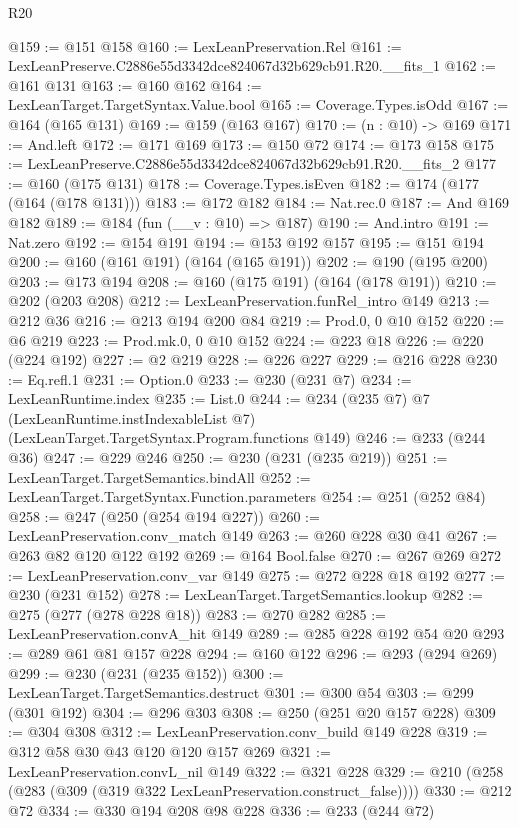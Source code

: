 \begin{lexlean}{R20}
\begin{coremodule}
@159 := @151 @158
@160 := LexLeanPreservation.Rel
@161 := LexLeanPreserve.C2886e55d3342dce824067d32b629cb91.R20.__fits_1
@162 := @161 @131
@163 := @160 @162
@164 := LexLeanTarget.TargetSyntax.Value.bool
@165 := Coverage.Types.isOdd
@167 := @164 (@165 @131)
@169 := @159 (@163 @167)
@170 := (n : @10) -> @169
@171 := And.left
@172 := @171 @169
@173 := @150 @72
@174 := @173 @158
@175 := LexLeanPreserve.C2886e55d3342dce824067d32b629cb91.R20.__fits_2
@177 := @160 (@175 @131)
@178 := Coverage.Types.isEven
@182 := @174 (@177 (@164 (@178 @131)))
@183 := @172 @182
@184 := Nat.rec.{0}
@187 := And @169 @182
@189 := @184 (fun (__v : @10) => @187)
@190 := And.intro
@191 := Nat.zero
@192 := @154 @191
@194 := @153 @192 @157
@195 := @151 @194
@200 := @160 (@161 @191) (@164 (@165 @191))
@202 := @190 (@195 @200)
@203 := @173 @194
@208 := @160 (@175 @191) (@164 (@178 @191))
@210 := @202 (@203 @208)
@212 := LexLeanPreservation.funRel_intro @149
@213 := @212 @36
@216 := @213 @194 @200 @84
@219 := Prod.{0, 0} @10 @152
@220 := @6 @219
@223 := Prod.mk.{0, 0} @10 @152
@224 := @223 @18
@226 := @220 (@224 @192)
@227 := @2 @219
@228 := @226 @227
@229 := @216 @228
@230 := Eq.refl.{1}
@231 := Option.{0}
@233 := @230 (@231 @7)
@234 := LexLeanRuntime.index
@235 := List.{0}
@244 := @234
    (@235 @7)
    @7
    (LexLeanRuntime.instIndexableList @7)
    (LexLeanTarget.TargetSyntax.Program.functions @149)
@246 := @233 (@244 @36)
@247 := @229 @246
@250 := @230 (@231 (@235 @219))
@251 := LexLeanTarget.TargetSemantics.bindAll
@252 := LexLeanTarget.TargetSyntax.Function.parameters
@254 := @251 (@252 @84)
@258 := @247 (@250 (@254 @194 @227))
@260 := LexLeanPreservation.conv_match @149
@263 := @260 @228 @30 @41
@267 := @263 @82 @120 @122 @192
@269 := @164 Bool.false
@270 := @267 @269
@272 := LexLeanPreservation.conv_var @149
@275 := @272 @228 @18 @192
@277 := @230 (@231 @152)
@278 := LexLeanTarget.TargetSemantics.lookup
@282 := @275 (@277 (@278 @228 @18))
@283 := @270 @282
@285 := LexLeanPreservation.convA_hit @149
@289 := @285 @228 @192 @54 @20
@293 := @289 @61 @81 @157 @228
@294 := @160 @122
@296 := @293 (@294 @269)
@299 := @230 (@231 (@235 @152))
@300 := LexLeanTarget.TargetSemantics.destruct
@301 := @300 @54
@303 := @299 (@301 @192)
@304 := @296 @303
@308 := @250 (@251 @20 @157 @228)
@309 := @304 @308
@312 := LexLeanPreservation.conv_build @149 @228
@319 := @312 @58 @30 @43 @120 @120 @157 @269
@321 := LexLeanPreservation.convL_nil @149
@322 := @321 @228
@329 := @210 (@258 (@283 (@309 (@319 @322 LexLeanPreservation.construct_false))))
@330 := @212 @72
@334 := @330 @194 @208 @98 @228
@336 := @233 (@244 @72)

\end{coremodule}
\end{lexlean}
